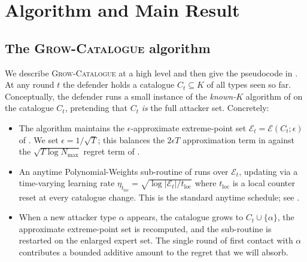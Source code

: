 \documentclass[letterpaper,9pt,twocolumn]{extarticle}
\newcommand{\cE}{\mathcal{E}}
\newcommand{\Nmax}{N_{\max}}
\theoremstyle{plain}
\theoremstyle{definition}
\theoremstyle{remark}
\begin{document}
\section{Algorithm and Main Result}
\label{sec:alg}

\subsection{The \textsc{Grow-Catalogue} algorithm}

We describe \textsc{Grow-Catalogue} at a high level and then give the
pseudocode in . At any round $t$ the defender holds a
catalogue $C_t\subseteq K$ of all types seen so far. Conceptually, the
defender runs a small instance of the \emph{known-$K$} algorithm of
\citet[\S 5]{balcan2015} on the catalogue $C_t$, pretending that $C_t$
\emph{is} the full attacker set. Concretely:
\begin{itemize}[leftmargin=1.1em,itemsep=0.05em,topsep=0.2em]
  \item The algorithm maintains the $\epsilon$-approximate extreme-point
  set $\cE_t=\cE(C_t;\epsilon)$ of . We set
  $\epsilon=1/\sqrt T$; this balances the $2\epsilon T$ approximation term
  in  against the $\sqrt{T\log\Nmax}$ regret term of
  .
  \item An anytime Polynomial-Weights sub-routine of
   runs over $\cE_t$, updating via a time-varying
  learning rate $\eta_{t_{\text{loc}}}=\sqrt{\log|\cE_t|/t_{\text{loc}}}$
  where $t_{\text{loc}}$ is a local counter reset at every catalogue
  change. This is the standard anytime schedule; see \citet[\S 2]{cesa2006}.
  \item When a new attacker type $\alpha$ appears, the catalogue grows to
  $C_t\cup\{\alpha\}$, the approximate extreme-point set is recomputed,
  and the sub-routine is restarted on the enlarged expert set. The single
  round of first contact with $\alpha$ contributes a bounded additive
  amount to the regret that we will absorb.
\end{itemize}
\end{document}
